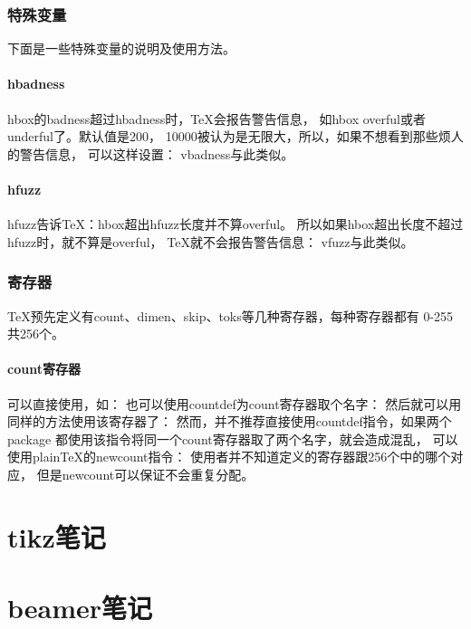 ﻿\documentclass{article}
\begin{document}
  \section[特殊变量]{特殊变量}
  下面是一些特殊变量的说明及使用方法。

  \subsection[hbadness]{\bs hbadness}
  \bs hbox的badness超过hbadness时，\TeX{}会报告警告信息，
  如\bs hbox overful或者underful了。默认值是200，
  10000被认为是无限大，所以，如果不想看到那些烦人的警告信息，
  可以这样设置：
  \bs vbadness与此类似。

  \subsection[hfuzz]{\bs hfuzz}
  \bs hfuzz告诉\TeX{}：\bs hbox超出\bs hfuzz长度并不算overful。
  所以如果\bs hbox超出长度不超过\bs hfuzz时，就不算是overful，
  \TeX{}就不会报告警告信息：
  \bs vfuzz与此类似。


  \section[寄存器]{寄存器}
  \TeX{}预先定义有count、dimen、skip、toks等几种寄存器，每种寄存器都有
  0-255共256个。

  \subsection[count寄存器]{count寄存器}
  可以直接使用，如：
  也可以使用\bs countdef为count寄存器取个名字：
  然后就可以用同样的方法使用该寄存器了：
  然而，并不推荐直接使用\bs countdef指令，如果两个package
  都使用该指令将同一个count寄存器取了两个名字，就会造成混乱，
  可以使用plain\TeX{}的\bs newcount指令：
  使用者并不知道定义的寄存器跟256个中的哪个对应，
  但是\bs newcount可以保证不会重复分配。

  \part[tikz笔记]{tikz笔记}
  
  \part[beamer笔记]{beamer笔记}

\end{document}
